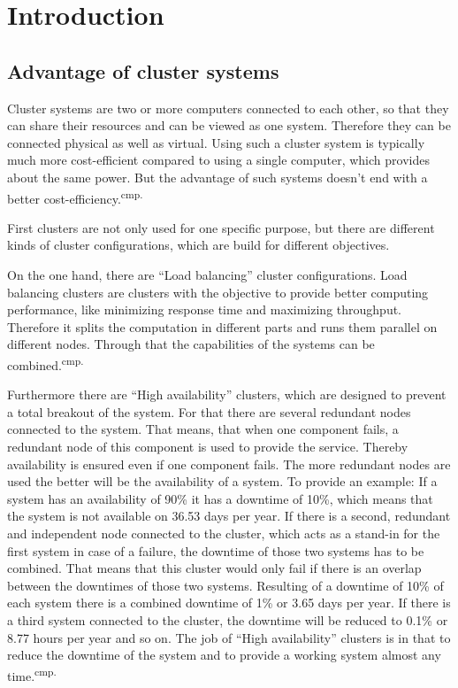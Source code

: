 
\chapter{Introduction}

\section{Advantage of cluster systems}

Cluster systems are two or more computers connected to each other, so that they can share their resources and can be viewed as one system. Therefore they can be connected physical as well as virtual. Using such a cluster system is typically much more cost-efficient compared to using a single computer, which provides about the same power. But the advantage of such systems doesn't end with a better cost-efficiency.\textsuperscript{cmp.\cite{1}}


First clusters are not only used for one specific purpose, but there are different kinds of cluster configurations, which are build for different objectives.

On the one hand, there are ``Load balancing'' cluster configurations. Load balancing clusters are clusters with the objective to provide better computing performance, like minimizing response time and maximizing throughput.  Therefore it splits the computation in different parts and runs them parallel on different nodes. Through that the capabilities of the systems can be combined.\textsuperscript{cmp.\cite{2}}


Furthermore there are ``High availability'' clusters, which are designed to prevent a total breakout of the system. For that there are several redundant nodes connected to the system. That means, that when one component fails, a redundant node of this component is used to provide the service. Thereby availability is ensured even if one component fails. The more redundant nodes are used the better will be the availability of a system. To provide an example: If a system has an availability of 90\% it has a downtime of 10\%, which means that the system is not available on 36.53 days per year. If there is a second, redundant and independent node connected to the cluster, which acts as a stand-in for the first system in case of a failure, the downtime of those two systems has to be combined. That means that this cluster would only fail if there is an overlap between the downtimes of those two systems. Resulting of a downtime of 10\% of each system there is a combined downtime of 1\% or 3.65 days per year. If there is a third system connected to the cluster, the downtime will be reduced to 0.1\% or 8.77 hours per year and so on. The job of ``High availability'' clusters is in that to reduce the downtime of the system and to provide a working system almost any time.\textsuperscript{cmp.\cite{3}}

